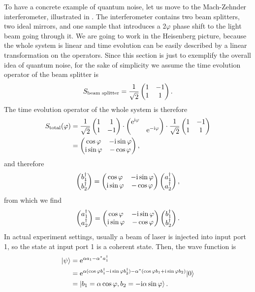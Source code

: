 \documentclass[hyperref, a4paper]{article}
\newcommand*{\ii}{\mathrm{i}}
\newcommand*{\ee}{\mathrm{e}}
\begin{document}
To have a concrete example of quantum noise, 
let us move to the Mach-Zehnder interferometer,
illustrated in .
The interferometer contains two beam splitters, 
two ideal mirrors, 
and one sample that introduces a $2\varphi$ phase shift to the light beam going through it.
We are going to work in the Heisenberg picture,
because the whole system is linear 
and time evolution can be easily described by a linear transformation on the operators. 
Since this section is just to exemplify the overall idea of quantum noise,
for the sake of simplicity we assume the time evolution operator of the beam splitter is 
\begin{equation}
    S_{\text{beam splitter}} = \frac{1}{\sqrt{2}} \pmqty{ 1 & -1 \\ 1 & 1 } .
\end{equation}
The time evolution operator of the whole system is therefore
\begin{equation}
    \begin{aligned}
        S_\text{total}(\varphi) &= \frac{1}{\sqrt{2}} \pmqty{ 1 & 1 \\ 1 & -1 } \cdot \pmqty{\dmat{\ee^{\ii \varphi}, \ee^{- \ii \varphi}}} \cdot \frac{1}{\sqrt{2}} \pmqty{ 1 & -1 \\ 1 & 1 } \\
        &= \pmqty{ \cos \varphi & - \ii \sin \varphi \\ \ii \sin \varphi & - \cos \varphi },
    \end{aligned}
    \label{eq:total-matrix}
\end{equation} 
and therefore 
\[
    \pmqty{b_1^\dagger \\ b_2^\dagger} = \pmqty{ \cos \varphi & - \ii \sin \varphi \\ \ii \sin \varphi & - \cos \varphi } \pmqty{a_1^\dagger \\ a_2^\dagger},
\]
from which we find 
\begin{equation}
    \pmqty{a_1^\dagger \\ a_2^\dagger} = \pmqty{ \cos \varphi & - \ii \sin \varphi \\ \ii \sin \varphi & - \cos \varphi } \pmqty{b_1^\dagger \\ b_2^\dagger}.
\end{equation}
In actual experiment settings,
usually a beam of laser is injected into input port 1,
so the state at input port 1 is a coherent state.
Then, the wave function is 
\begin{equation}
    \begin{aligned}
        \ket{\psi} &= \ee^{\alpha a_1 - \alpha^* a_1^\dagger} \\
        &= \ee^{\alpha (\cos \varphi b_1^\dagger - \ii \sin \varphi b_2^\dagger) -\alpha^{*} (\cos \varphi b_1 + \ii \sin \varphi b_2)}|0\rangle \\
        &= \ket{b_1 = \alpha \cos \varphi, b_2 = - \ii \alpha \sin \varphi} .
    \end{aligned}
    \label{eq:out-state}
\end{equation}
\end{document}
